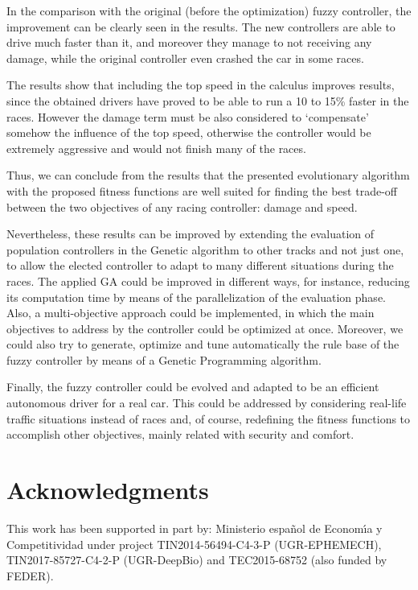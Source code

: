 \documentclass[conference]{IEEEtran}
\begin{document}
In the comparison with the original (before the optimization) fuzzy controller, the improvement can be clearly seen in the results. The new controllers are able to drive much faster than it, and moreover they manage to not receiving any damage, while the original controller even crashed the car in some races.

The results show that including the top speed in the calculus improves
results, since the obtained drivers have proved to be able to run a 10
to 15\% faster in the races. However the damage term must be also
considered to `compensate' somehow the influence of the top speed,
otherwise the controller would be extremely aggressive and would not
finish many of the races.

Thus, we can conclude from the results that the presented evolutionary
algorithm with the
proposed fitness functions are well suited for finding the best
trade-off between the two objectives of any racing controller: damage
and speed. 

Nevertheless, these results can be improved by extending the
evaluation of population controllers in the Genetic algorithm to other
tracks and not just one, to allow the elected controller to adapt to many different situations during the races.
The applied GA could be improved in different ways, for instance, reducing its computation time by means of the parallelization of the evaluation phase.
Also, a multi-objective approach could be implemented, in which the main objectives to address by the controller could be optimized at once.
Moreover, we could also try to generate, optimize and tune
automatically the rule base of the fuzzy controller by means of a
Genetic Programming algorithm.  

Finally, the fuzzy controller could be evolved and adapted to be an efficient autonomous driver for a real car. This could be addressed by considering real-life traffic situations instead of races and, of course, redefining the fitness functions to accomplish other objectives, mainly related with security and comfort.

\section*{Acknowledgments}

This work has been supported in part by: Ministerio espa\~{n}ol de
Econom\'{\i}a y Competitividad under project TIN2014-56494-C4-3-P
(UGR-EPHEMECH), TIN2017-85727-C4-2-P (UGR-DeepBio) and TEC2015-68752 (also funded by FEDER).




\end{document}
